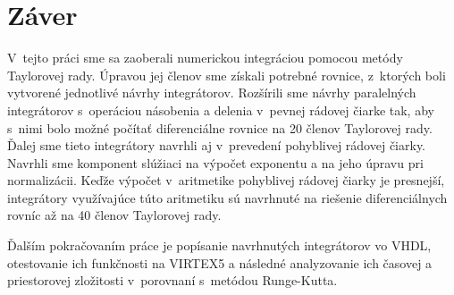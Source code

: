 \chapter{Záver}
V~tejto práci sme sa zaoberali numerickou integráciou pomocou metódy Taylorovej rady. Úpravou jej členov sme získali potrebné rovnice, z~ktorých boli vytvorené jednotlivé návrhy integrátorov.
Rozšírili sme návrhy paralelných integrátorov s~operáciou násobenia a delenia v~pevnej rádovej čiarke tak, aby s~nimi bolo možné počítať diferenciálne rovnice na 20 členov Taylorovej rady. Ďalej sme tieto integrátory navrhli aj v~prevedení pohyblivej rádovej čiarky. Navrhli sme komponent slúžiaci na výpočet exponentu a na jeho úpravu pri normalizácii. Keďže výpočet v~aritmetike pohyblivej rádovej čiarky je presnejší, integrátory využívajúce túto aritmetiku sú navrhnuté na riešenie diferenciálnych rovníc až na 40 členov Taylorovej rady.

Ďalším pokračovaním práce je popísanie navrhnutých integrátorov vo VHDL, otestovanie ich funkčnosti na VIRTEX5 a následné analyzovanie ich časovej a priestorovej zložitosti v~porovnaní s~metódou Runge-Kutta.

